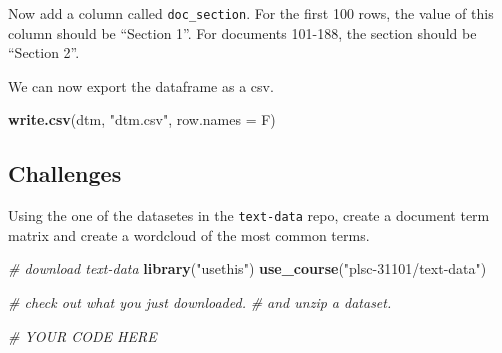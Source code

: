 \documentclass[]{book}
\newenvironment{Shaded}{\begin{snugshade}}{\end{snugshade}}
\newcommand{\CommentTok}[1]{\textcolor[rgb]{0.56,0.35,0.01}{\textit{#1}}}
\newcommand{\DataTypeTok}[1]{\textcolor[rgb]{0.13,0.29,0.53}{#1}}
\newcommand{\DecValTok}[1]{\textcolor[rgb]{0.00,0.00,0.81}{#1}}
\newcommand{\KeywordTok}[1]{\textcolor[rgb]{0.13,0.29,0.53}{\textbf{#1}}}
\newcommand{\NormalTok}[1]{#1}
\newcommand{\OperatorTok}[1]{\textcolor[rgb]{0.81,0.36,0.00}{\textbf{#1}}}
\newcommand{\StringTok}[1]{\textcolor[rgb]{0.31,0.60,0.02}{#1}}
\begin{document}
Now add a column called \texttt{doc\_section}. For the first 100 rows, the value of this column should be ``Section 1''. For documents 101-188, the section should be ``Section 2''.

\begin{Shaded}
\end{Shaded}

We can now export the dataframe as a csv.

\begin{Shaded}
\begin{Highlighting}[]
\KeywordTok{write.csv}\NormalTok{(dtm, }\StringTok{"dtm.csv"}\NormalTok{, }\DataTypeTok{row.names =}\NormalTok{ F)}
\end{Highlighting}
\end{Shaded}

\hypertarget{challenges-24}{%
\subsection{Challenges}\label{challenges-24}}

Using the one of the datasetes in the \texttt{text-data} repo, create a document term matrix and create a wordcloud of the most common terms.

\begin{Shaded}
\begin{Highlighting}[]
\CommentTok{# download text-data}
\KeywordTok{library}\NormalTok{(}\StringTok{"usethis"}\NormalTok{)}
\KeywordTok{use_course}\NormalTok{(}\StringTok{"plsc-31101/text-data"}\NormalTok{)}

\CommentTok{# check out what you just downloaded.}
\CommentTok{# and unzip a dataset.}

\CommentTok{# YOUR CODE HERE}
\end{Highlighting}
\end{Shaded}
\end{document}
